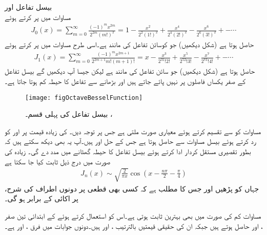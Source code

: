 \quad بیسل تفاعل  اور \\
مساوات  میں  پر کرتے ہوئے  
\begin{align}\label{مساوات_بیسل_د}
J_0(x)=\sum_{m=0}^{\infty} \frac{(-1)^m x^{2m}}{2^{2m} (m!)^2} =1-\frac{x^2}{2^2(1!)^2}+\frac{x^4}{2^4(2!)^2}-\frac{x^6}{2^6(3!)^2}+-\cdots
\end{align}
حاصل ہوتا ہے (شکل  دیکھیں) جو کوسائن تفاعل کی مانند ہے۔اسی طرح مساوات  میں  پر کرتے ہوئے   
\begin{align}\label{مساوات_بیسل_ڈ}
J_1(x)=\sum_{m=0}^{\infty} \frac{(-1)^m x^{2m+1}}{2^{2m+1} m!(m+1)!}=x-\frac{x^3}{2^31!2!}+\frac{x^5}{2^52!3!}-\frac{x^7}{2^73!4!}+-\cdots
\end{align}
حاصل ہوتا ہے  (شکل  دیکھیں) جو سائن تفاعل کی مانند ہے لیکن جیسا آپ دیکھیں گے بیسل تفاعل کے صفر یکساں فاصلوں پر نہیں پائے جاتے ہیں اور  بڑھانے سے  تفاعل کا حیطہ کم ہوتا جاتا ہے۔
\begin{figure}
\centering
\texttt{[image: figOctaveBesselFunction]}
\caption{بیسل تفاعل کی پہلی قسم۔ ، }
\label{شکل_بیسل_تفاعل}
\end{figure}
مساوات  کو  سے تقسیم کرتے ہوئے  معیاری صورت  ملتی ہے جس پر توجہ دیں۔  کی زیادہ قیمت پر  اور  کو رد کرتے ہوئے بیسل مساوات سے  حاصل ہوتا ہے جس کے حل  اور  ہیں۔آپ یہ بھی دیکھ سکتے ہیں کہ  بطور تقصیری مستقل کردار ادا کرتے ہوئے بیسل تفاعل کا حیطہ گھٹانے میں مدد دے گی۔ زیادہ  کی صورت میں درج ذیل ثابت کیا جا سکتا ہے
\begin{align}\label{مساوات_بیسل_ذ}
J_n(x) \sim \sqrt{\frac{2}{\pi x}} \cos(x-\frac{n\pi}{2}-\frac{\pi}{4})
\end{align}
جہاں  کو  پڑھیں اور جس کا مطلب ہے کہ کسی بھی قطعی  پر دونوں اطراف کی شرح،  پر اکائی کے برابر ہو گی۔ 

مساوات  کم  کی صورت میں بھی بہترین ثابت ہوتی ہے۔اس کو استعمال کرتے ہوئے  کے ابتدائی تین صفر ،  اور  حاصل ہوتے ہیں جبکہ ان کی حقیقی قیمتیں بالترتیب ،  اور  ہیں۔دونوں جوابات میں فرق ،  اور  ہے۔


